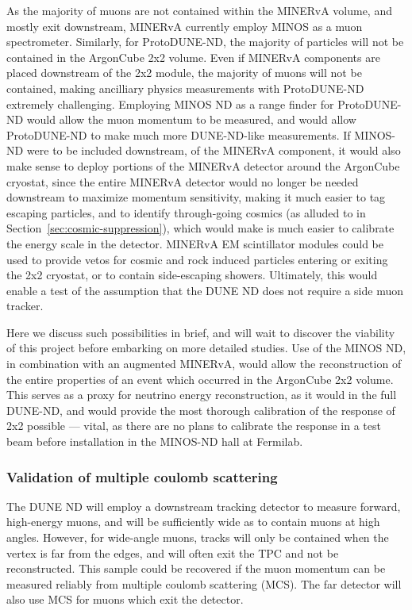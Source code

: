 As the majority of muons are not contained within the MINERvA volume, and mostly exit downstream, MINERvA currently employ MINOS as a muon spectrometer. Similarly, for ProtoDUNE-ND, the majority of particles will not be contained in the ArgonCube 2x2 volume. Even if MINERvA components are placed downstream of the 2x2 module, the majority of muons will not be contained, making ancilliary physics measurements with ProtoDUNE-ND extremely challenging. Employing MINOS ND as a range finder for ProtoDUNE-ND would allow the muon momentum to be measured, and would allow ProtoDUNE-ND to make much more DUNE-ND-like measurements. If MINOS-ND were to be included downstream, of the MINERvA component, it would also make sense to deploy portions of the MINERvA detector around the ArgonCube cryostat, since the entire MINERvA detector would no longer be needed downstream to maximize momentum sensitivity, making it much easier to tag escaping particles, and to identify through-going cosmics (as alluded to in Section~\ref{sec:cosmic-suppression}), which would make is much easier to calibrate the energy scale in the detector. MINERvA EM scintillator modules could be used to provide vetos for cosmic and rock induced particles entering or exiting the 2x2 cryostat, or to contain side-escaping showers. Ultimately, this would enable a test of the assumption that the DUNE ND does not require a side muon tracker.

Here we discuss such possibilities in brief, and will wait to discover the viability of this project before embarking on more detailed studies. Use of the MINOS ND, in combination with an augmented MINERvA, would allow the reconstruction of the entire properties of an event which occurred in the ArgonCube 2x2 volume. This serves as a proxy for neutrino energy reconstruction, as it would in the full DUNE-ND, and would provide the most thorough calibration of the response of 2x2 possible --- vital, as there are no plans to calibrate the response in a test beam before installation in the MINOS-ND hall at Fermilab.

\subsubsection{Validation of multiple coulomb scattering}

The DUNE ND will employ a downstream tracking detector to measure forward, high-energy muons, and will be sufficiently wide as to contain muons at high angles.  However, for wide-angle muons, tracks will only be contained when the vertex is far from the edges, and will often exit the TPC and not be reconstructed.  This sample could be recovered if the muon momentum can be measured reliably from multiple coulomb scattering (MCS). The far detector will also use MCS for muons which exit the detector.

